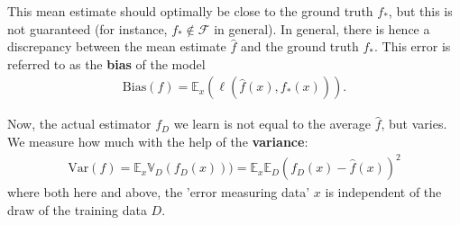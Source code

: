 \documentclass{article}
\newcommand{\calF}{\mathcal{F}}
\begin{document}
This mean estimate should optimally be close to the ground truth $f_*$, but this is not guaranteed (for instance, $f_*\notin \calF$ in general). In general, there is hence a discrepancy between the mean estimate $\widehat{f}$ and the ground truth $f_*$. This error is referred to as the \textbf{bias} of the model
\begin{align*}
    \mathrm{Bias}(f) = \mathbb{E}_x(\ell(\widehat{f}(x),f_*(x))).
\end{align*}

Now, the actual estimator $f_D$ we learn is not equal to the average $\widehat{f}$, but varies. We measure how much with the help of the \textbf{variance}:
\begin{align*}
    \mathrm{Var}(f) = \mathbb{E}_x \mathbb{V}_D(f_D(x))) = \mathbb{E}_x \mathbb{E}_D(f_D(x)-\widehat{f}(x))^2
\end{align*}
where both here and above, the 'error measuring data' $x$ is independent of the draw of the training data $D$. 
\end{document}
